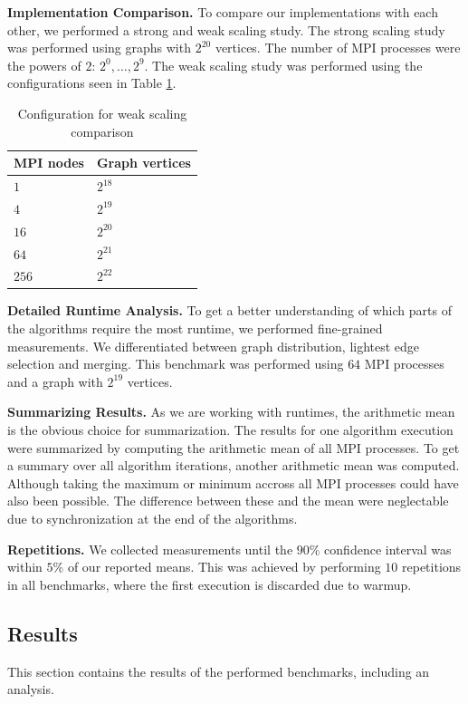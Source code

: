 \documentclass[letterpaper]{article}
\newcommand{\mypar}[1]{{\bf #1.}}
\begin{document}
\mypar{Implementation Comparison}
To compare our implementations with each other, we performed a strong and weak scaling study. The strong scaling study
was performed using graphs with $2^{20}$ vertices. The number of MPI processes were the powers of $2$: $2^0, \dotsc,
2^9$. The weak scaling study was performed using the configurations seen in Table \ref{tab:weakscaling-table}.
\begin{table}[h!]
  \centering
  \begin{tabular}{ll} \toprule
    \textbf{MPI nodes} & \textbf{Graph vertices} \\\midrule
    $1$ & $2^{18}$ \\ 
    $4$ & $2^{19}$ \\ 
    $16$ & $2^{20}$ \\
    $64$ & $2^{21}$ \\
    $256$ & $2^{22}$ \\ \bottomrule \hline
  \end{tabular}
  \caption{Configuration for weak scaling comparison}
  \label{tab:weakscaling-table}
\end{table}

\mypar{Detailed Runtime Analysis}
To get a better understanding of which parts of the algorithms require the most runtime, we performed fine-grained
measurements. We differentiated between graph distribution, lightest edge selection and merging. This benchmark was
performed using $64$ MPI processes and a graph with $2^{19}$ vertices.

\mypar{Summarizing Results}
As we are working with runtimes, the arithmetic mean is the obvious choice for summarization. The results for one
algorithm execution were summarized by computing the arithmetic mean of all MPI processes. To get a summary over all
algorithm iterations, another arithmetic mean was computed. Although taking the maximum or minimum accross all MPI
processes could have also been possible. The difference between these and the mean were neglectable due to
synchronization at the end of the algorithms. %

\mypar{Repetitions}
We collected measurements until the $90\%$ confidence interval was within $5\%$ of our reported means. This was achieved
by performing $10$ repetitions in all benchmarks, where the first execution is discarded due to warmup.

\subsection{Results}
This section contains the results of the performed benchmarks, including an analysis.
\end{document}
